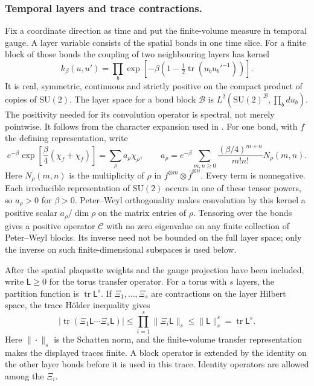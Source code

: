 \documentclass[11pt,letterpaper,reqno]{amsart}
\theoremstyle{definition}
\theoremstyle{remark}
\newcommand{\SU}{\mathrm{SU}}
\newcommand{\tr}{\operatorname{tr}}
\begin{document}
\subsubsection*{Temporal layers and trace contractions.}
Fix a coordinate direction as time and put the finite-volume measure
in temporal gauge. A layer variable consists of the spatial bonds in
one time slice. For a finite block of those bonds the coupling of two
neighbouring layers has kernel
\begin{equation}\label{eq:expanded-layer-kernel}
 k_\beta(u,u')=
 \prod_{b}\exp\!\left[-\beta\left(1-\tfrac12
                         \tr(u_bu_b'^{-1})\right)\right].
\end{equation}
It is real, symmetric, continuous and strictly positive on the
compact product of copies of $\SU(2)$. The layer space for a bond
block $\mathcal B$ is $L^2(\SU(2)^{\mathcal B},\prod_bdu_b)$.
The positivity needed for its
convolution operator is spectral, not merely pointwise. It follows
from the character expansion used in
\cite[DESY76/54, \S II.B, Proposition~1, pp.~8--9]{Luscher1977}.
For one bond, with $f$ the defining representation, write
\[
 e^{-\beta}\exp\!\left[\frac\beta4
                      (\chi_f+\chi_{\bar f})\right]
 =\sum_\rho a_\rho\chi_\rho,
 \qquad
 a_\rho=e^{-\beta}\sum_{m,n\ge0}
       \frac{(\beta/4)^{m+n}}{m!n!}N_\rho(m,n).
\]
Here $N_\rho(m,n)$ is the multiplicity of $\rho$ in
$f^{\otimes m}\otimes\bar f^{\otimes n}$. Every term is
nonnegative. Each irreducible representation of $\SU(2)$ occurs in
one of these tensor powers, so $a_\rho>0$ for $\beta>0$.
Peter--Weyl orthogonality makes convolution by this kernel a positive
scalar $a_\rho/\dim\rho$ on the matrix entries of $\rho$. Tensoring
over the bonds gives a positive operator $\mathcal C$ with no zero
eigenvalue on any finite collection of Peter--Weyl blocks. Its inverse
need not be bounded on the full layer space; only the inverse on such
finite-dimensional subspaces is used below.

After the spatial plaquette weights and the gauge projection have
been included, write $\mathsf L\ge0$ for the torus transfer operator.
For a torus with $s$ layers, the partition function is
$\tr\mathsf L^s$. If $\Xi_1,\ldots,\Xi_s$ are contractions on the
layer Hilbert space, the trace H\"older inequality gives
\begin{equation}\label{eq:expanded-layer-holder}
 \big|\tr(\Xi_1\mathsf L\cdots\Xi_s\mathsf L)\big|
 \le\prod_{i=1}^s\|\Xi_i\mathsf L\|_s
 \le\|\mathsf L\|_s^s
 =\tr\mathsf L^s.
\end{equation}
Here $\|\cdot\|_s$ is the Schatten norm, and the finite-volume
transfer representation makes the displayed traces finite. A block operator is extended by the identity on the other layer
bonds before it is used in this trace. Identity operators are allowed
among the $\Xi_i$.
\end{document}
